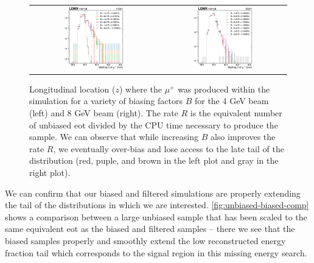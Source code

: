 \begin{figure}
  \centering
  \begin{tabular}{cc}
    \includegraphics[width=0.49\textwidth]{figures/ldmx/simulation/dimuon-z-4gev.pdf}
    &
    \includegraphics[width=0.49\textwidth]{figures/ldmx/simulation/dimuon-z-8gev.pdf}
  \end{tabular}
  \caption{
    Longitudinal location ($z$) where the $\mu^+$ was produced within the simulation
    for a variety of biasing factors $B$ for the 4 GeV beam (left) and 8 GeV beam (right).
    The rate $R$ is the equivalent number of unbiased \ac{eot} divided by the CPU time
    necessary to produce the sample.
    We can observe that while increasing $B$ also improves the rate $R$,
    we eventually over-bias and lose access to the late tail of the distribution
    (red, puple, and brown in the left plot and gray in the right plot).
  }
  \label{fig:dimuon-z}
\end{figure}

We can confirm that our biased and filtered simulations are properly extending
the tail of the distributions in which we are interested.
\cref{fig:unbiased-biased-comp} shows a comparison between a large unbiased
sample that has been scaled to the same equivalent \ac{eot} as the biased and
filtered samples -- there we see that the biased samples properly and smoothly
extend the low reconstructed energy fraction tail which corresponds to the
signal region in this missing energy search.

